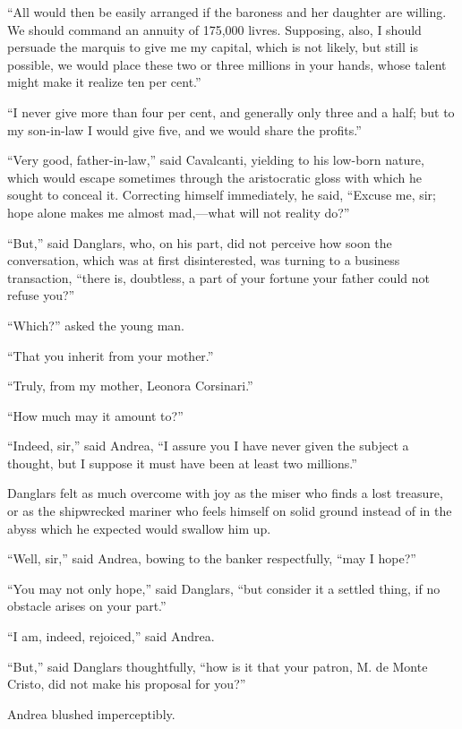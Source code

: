 “All would then be easily arranged if the baroness and her daughter are
willing. We should command an annuity of 175,000 livres. Supposing,
also, I should persuade the marquis to give me my capital, which is not
likely, but still is possible, we would place these two or three
millions in your hands, whose talent might make it realize ten per
cent.”

“I never give more than four per cent, and generally only three and a
half; but to my son-in-law I would give five, and we would share the
profits.”

“Very good, father-in-law,” said Cavalcanti, yielding to his low-born
nature, which would escape sometimes through the aristocratic gloss
with which he sought to conceal it. Correcting himself immediately, he
said, “Excuse me, sir; hope alone makes me almost mad,—what will not
reality do?”

“But,” said Danglars, who, on his part, did not perceive how soon the
conversation, which was at first disinterested, was turning to a
business transaction, “there is, doubtless, a part of your fortune your
father could not refuse you?”

“Which?” asked the young man.

“That you inherit from your mother.”

“Truly, from my mother, Leonora Corsinari.”

“How much may it amount to?”

“Indeed, sir,” said Andrea, “I assure you I have never given the
subject a thought, but I suppose it must have been at least two
millions.”

Danglars felt as much overcome with joy as the miser who finds a lost
treasure, or as the shipwrecked mariner who feels himself on solid
ground instead of in the abyss which he expected would swallow him up.

“Well, sir,” said Andrea, bowing to the banker respectfully, “may I
hope?”

“You may not only hope,” said Danglars, “but consider it a settled
thing, if no obstacle arises on your part.”

“I am, indeed, rejoiced,” said Andrea.

“But,” said Danglars thoughtfully, “how is it that your patron, M. de
Monte Cristo, did not make his proposal for you?”

Andrea blushed imperceptibly.

